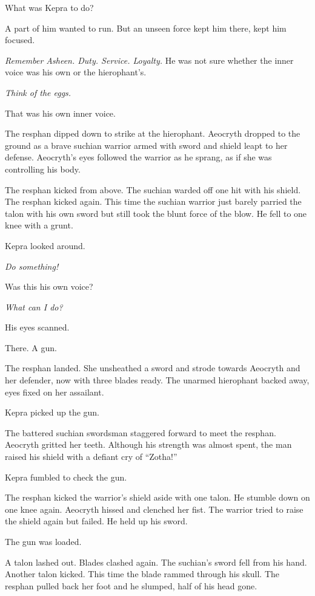 \documentclass
  [a4paper,
   12pt,
   oneside
  ]%
  {article}
\begin{document}
What was Kepra to do? 

A part of him wanted to run. But an unseen force kept him there, kept him focused.

\emph{Remember Asheen. Duty. Service. Loyalty.} 
He was not sure whether the inner voice was his own or the hierophant's.

\emph{Think of the eggs.} 

That was his own inner voice.

The resphan dipped down to strike at the hierophant. 
Aeocryth dropped to the ground as a brave suchian warrior armed with sword and shield leapt to her defense. 
Aeocryth's eyes followed the warrior as he sprang, as if she was controlling his body.

The resphan kicked from above. 
The suchian warded off one hit with his shield. 
The resphan kicked again. 
This time the suchian warrior just barely parried the talon with his own sword but still took the blunt force of the blow. 
He fell to one knee with a grunt. 

Kepra looked around. 

\emph{Do something!}

Was this his own voice?

\emph{What can I do?}

His eyes scanned.

There. A gun. 

The resphan landed. She unsheathed a sword and strode towards Aeocryth and her defender, now with three blades ready. The unarmed hierophant backed away, eyes fixed on her assailant. 

Kepra picked up the gun. 

The battered suchian swordsman staggered forward to meet the resphan. Aeocryth gritted her teeth. Although his strength was almost spent, the man raised his shield with a defiant cry of ``Zotha!''

Kepra fumbled to check the gun. 

The resphan kicked the warrior's shield aside with one talon. 
He stumble down on one knee again. 
Aeocryth hissed and clenched her fist.
The warrior tried to raise the shield again but failed. 
He held up his sword. 

The gun was loaded.

A talon lashed out. Blades clashed again. The suchian’s sword fell from his hand. Another talon kicked. This time the blade rammed through his skull. 
The resphan pulled back her foot and he slumped, half of his head gone.
\end{document}
